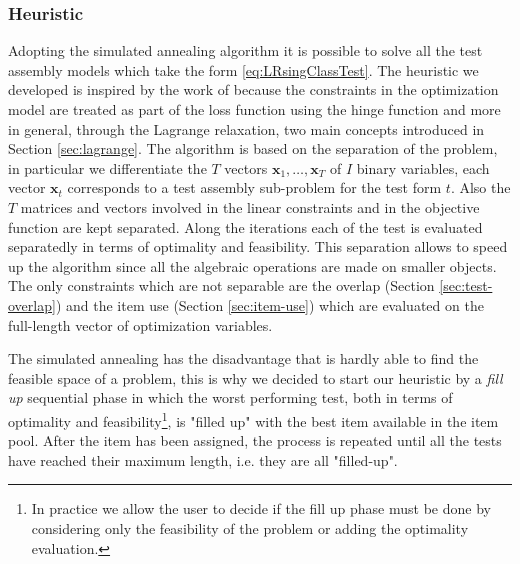 \subsubsection{Heuristic}

Adopting the simulated annealing algorithm it is possible to solve all the test assembly models which take the form \eqref{eq:LRsingClassTest}. The heuristic we developed is inspired by the work of \textcite{Stocking1993} because the constraints in the optimization model are treated as part of the loss function using the hinge function and more in general, through the Lagrange relaxation, two main concepts introduced in Section \ref{sec:lagrange}. 
The algorithm is based on the separation of the problem, in particular we differentiate the $T$ vectors $\mathbf{x}_1, \ldots, \mathbf{x}_T$ of $I$ binary variables, each vector $\mathbf{x}_t$ corresponds to a test assembly sub-problem for the test form $t$. Also the $T$ matrices and vectors involved in the linear constraints and in the objective function are kept separated. Along the iterations each of the test is evaluated separatedly in terms of optimality and feasibility. This separation allows to speed up the algorithm since all the algebraic operations are made on smaller objects. The only constraints which are not separable are the overlap (Section \ref{sec:test-overlap}) and the item use (Section \ref{sec:item-use}) which are evaluated on the full-length vector of optimization variables.

The simulated annealing has the disadvantage that is hardly able to find the feasible space of a problem, this is why we decided to start our heuristic by a \emph{fill up} sequential phase in which the worst performing test, both in terms of optimality and feasibility\footnote{In practice we allow the user to decide if the fill up phase must be done by considering only the feasibility of the problem or adding the optimality evaluation.}, is "filled up" with the best item available in the item pool. After the item has been assigned, the process is repeated until all the tests have reached their maximum length, i.e. they are all "filled-up".

